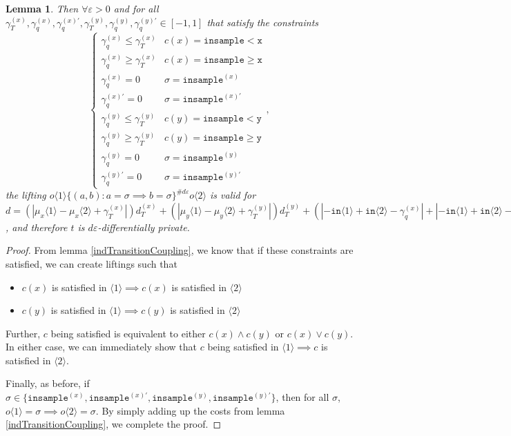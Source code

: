 \documentclass[12pt]{article}
\newcommand{\gguard}[1][x]{\texttt{insample}\geq #1}
\newcommand{\lguard}[1][x]{\texttt{insample} < #1}
\newcommand{\brangle}[1]{\langle #1 \rangle}
\newtheorem{lemma}[thm]{Lemma}
\theoremstyle{definition}
\begin{document}
\begin{lemma}
    Then $\forall \varepsilon>0$ and for all $\gamma_T^{(x)}, \gamma_q^{(x)}, \gamma_q^{(x)\prime},\gamma_T^{(y)}, \gamma_q^{(y)}, \gamma_q^{(y)\prime}\in [-1, 1]$ that satisfy the constraints \[
        \begin{cases}
          \gamma_q^{(x)}\leq\gamma_T^{(x)} & c(x) = \lguard[\texttt{x}]\\
          \gamma_q^{(x)}\geq\gamma_T^{(x)} & c(x) = \gguard[\texttt{x}]\\
          \gamma_q^{(x)}=0 & \sigma = \texttt{insample}^{(x)}\\
          \gamma_q^{(x)\prime}=0 & \sigma = \texttt{insample}^{(x)\prime}\\
          \gamma_q^{(y)}\leq\gamma_T^{(y)} & c(y) = \lguard[\texttt{y}]\\
          \gamma_q^{(y)}\geq\gamma_T^{(y)} & c(y) = \gguard[\texttt{y}]\\
          \gamma_q^{(y)}=0 & \sigma = \texttt{insample}^{(y)}\\
          \gamma_q^{(y)\prime}=0 & \sigma = \texttt{insample}^{(y)\prime}
        \end{cases},
      \]
      the lifting $o\brangle{1}\{(a, b): a=\sigma\implies b=\sigma\}^{\#d\varepsilon}o\brangle{2}$ is valid for 
      $d = (|\mu_x\brangle{1}-\mu_x\brangle{2}+\gamma_T^{(x)}|)d_T^{(x)}+(|\mu_y\brangle{1}-\mu_y\brangle{2}+\gamma_T^{(y)}|)d_T^{(y)}+(|-\texttt{in}\brangle{1}+\texttt{in}\brangle{2}-\gamma_q^{(x)}|+|-\texttt{in}\brangle{1}+\texttt{in}\brangle{2}-\gamma_q^{(y)}|)d_q+(|-\texttt{in}\brangle{1}+\texttt{in}\brangle{2}-\gamma_q^{(x)\prime}|+|-\texttt{in}\brangle{1}+\texttt{in}\brangle{2}-\gamma_q^{(y)\prime}|)d_q'$, and therefore $t$ is $d\varepsilon$-differentially private. 
\end{lemma}
\begin{proof}
    From lemma \ref{indTransitionCoupling}, we know that if these constraints are satisfied, we can create liftings such that \begin{itemize}
        \item $c(x)$ is satisfied in $\brangle{1}\implies c(x)$ is satisfied in $\brangle{2}$
        \item $c(y)$ is satisfied in $\brangle{1}\implies c(y)$ is satisfied in $\brangle{2}$
    \end{itemize}
    Further, $c$ being satisfied is equivalent to either $c(x)\land c(y)$ or $c(x)\lor c(y)$. In either case, we can immediately show that $c$ being satisfied in $\brangle{1}\implies c$ is satisfied in $\brangle{2}$.

    Finally, as before, if $\sigma \in \{\texttt{insample}^{(x)}, \texttt{insample}^{(x)\prime}, \texttt{insample}^{(y)},\texttt{insample}^{(y)\prime}\}$, then for all $\sigma$, $o\brangle{1}=\sigma \implies o\brangle{2} = \sigma$. By simply adding up the costs from lemma \ref{indTransitionCoupling}, we complete the proof.
\end{proof}
\end{document}
